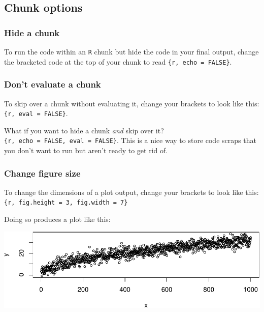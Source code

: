 \documentclass[]{book}
\begin{document}
\hypertarget{chunk-options}{%
\subsection*{Chunk options}\label{chunk-options}}

\hypertarget{hide-a-chunk}{%
\subsubsection*{Hide a chunk}\label{hide-a-chunk}}

To run the code within an \texttt{R} chunk but hide the code in your final output, change the bracketed code at the top of your chunk to read \texttt{\{r,\ echo\ =\ FALSE\}}.

\hypertarget{dont-evaluate-a-chunk}{%
\subsubsection*{Don't evaluate a chunk}\label{dont-evaluate-a-chunk}}

To skip over a chunk without evaluating it, change your brackets to look like this: \texttt{\{r,\ eval\ =\ FALSE\}}.

What if you want to hide a chunk \emph{and} skip over it? \texttt{\{r,\ echo\ =\ FALSE,\ eval\ =\ FALSE\}}. This is a nice way to store code scraps that you don't want to run but aren't ready to get rid of.

\hypertarget{change-figure-size}{%
\subsubsection*{Change figure size}\label{change-figure-size}}

To change the dimensions of a plot output, change your brackets to look like this:
\texttt{\{r,\ fig.height\ =\ 3,\ fig.width\ =\ 7\}}

Doing so produces a plot like this:

\includegraphics{figures/unnamed-chunk-360-1.pdf}
\end{document}
